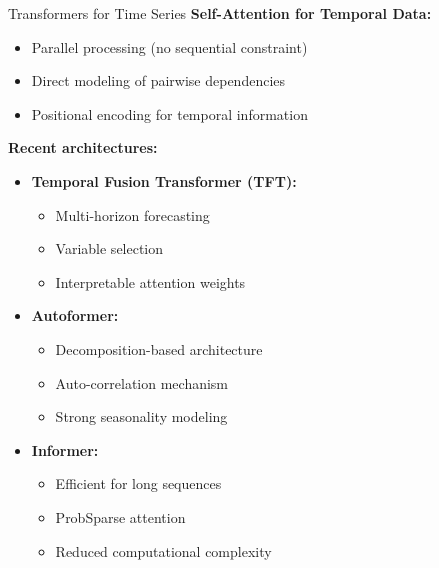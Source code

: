 \documentclass[aspectratio=169]{beamer}
\begin{document}
\begin{frame}{Transformers for Time Series}
  \textbf{Self-Attention for Temporal Data:}

  \begin{itemize}
    \item Parallel processing (no sequential constraint)
    \item Direct modeling of pairwise dependencies
    \item Positional encoding for temporal information
  \end{itemize}

  \vspace{0.5em}

  \textbf{Recent architectures:}
  \begin{itemize}
    \item \textbf{Temporal Fusion Transformer (TFT):}
    \begin{itemize}
      \item Multi-horizon forecasting
      \item Variable selection
      \item Interpretable attention weights
    \end{itemize}

    \item \textbf{Autoformer:}
    \begin{itemize}
      \item Decomposition-based architecture
      \item Auto-correlation mechanism
      \item Strong seasonality modeling
    \end{itemize}

    \item \textbf{Informer:}
    \begin{itemize}
      \item Efficient for long sequences
      \item ProbSparse attention
      \item Reduced computational complexity
    \end{itemize}
  \end{itemize}
\end{frame}
\end{document}
